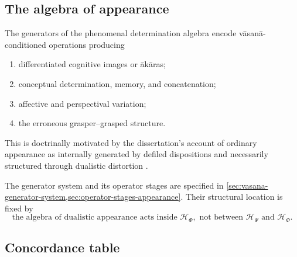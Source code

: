 \documentclass[11pt,reqno]{scrartcl}
\newcommand{\scrHP}{\mathscr H_{\Psi}}
\newcommand{\scrHF}{\mathscr H_{\Phi}}
\theoremstyle{plain}
\theoremstyle{definition}
\theoremstyle{remark}
\begin{document}
\subsection{The algebra of appearance}

The generators of the phenomenal determination algebra encode
v\=asan\=a-conditioned operations producing
\begin{enumerate}[label=(\roman*)]
  \item differentiated cognitive images or \=ak\=aras;
  \item conceptual determination, memory, and concatenation;
  \item affective and perspectival variation;
  \item the erroneous grasper--grasped structure.
\end{enumerate}
This is doctrinally motivated by the dissertation's account of ordinary
appearance as internally generated by defiled dispositions and necessarily
structured through dualistic distortion \cite[pp.~27--28]{Yiannopoulos2020}.

The generator system and its operator stages are specified in
\cref{sec:vasana-generator-system,sec:operator-stages-appearance}.
Their structural location is fixed by
\begin{equation}
  \boxed{
  \text{the algebra of dualistic appearance acts inside }\scrHF,
  \text{ not between }\scrHP\text{ and }\scrHF.}
  \label{eq:appearance-location}
\end{equation}

\subsection{Concordance table}
\end{document}
